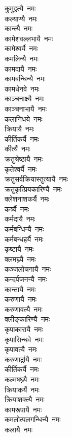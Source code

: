\begin{flushleft}
\begin{multicols}{2}
कुमुद्वत्यै~नमः\\
कल्याण्यै~नमः\\
कान्त्यै~नमः\hfill{}\\
कामेशवल्लभायै~नमः\\
कामेश्वर्यै~नमः\\
कमलिन्यै~नमः\\
कामदायै~नमः\\
कामबन्धिन्यै~नमः\\
कामधेनवे~नमः\\
काञ्चनाक्ष्यै~नमः\\
काञ्चनाभायै~नमः\\
कलानिधये~नमः\\
क्रियायै~नमः\hfill{}\\
कीर्तिकर्यै~नमः\\
कीर्त्यै~नमः\\
क्रतुश्रेष्ठायै~नमः\\
कृतेश्वर्यै~नमः\\
क्रतुसर्वक्रियास्तुत्यायै~नमः\\
क्रतुकृत्प्रियकारिण्यै~नमः\\
क्लेशनाशकर्यै~नमः\\
कर्त्र्यै~नमः\\
कर्मदायै~नमः\\
कर्मबन्धिन्यै~नमः\hfill{}\\
कर्मबन्धहर्यै~नमः\\
कृष्टायै~नमः\\
क्लमघ्न्यै~नमः\\
कञ्जलोचनायै~नमः\\
कन्दर्पजनन्यै~नमः\\
कान्तायै~नमः\\
करुणायै~नमः\\
करुणावत्यै~नमः\\
क्लीङ्कारिण्यै~नमः\\
कृपाकारायै~नमः\hfill{}\\
कृपासिन्धवे~नमः\\
कृपावत्यै~नमः\\
करुणार्द्रायै~नमः\\
कीर्तिकर्यै~नमः\\
कल्मषघ्न्यै~नमः\\
क्रियाकर्यै~नमः\\
क्रियाशक्त्यै~नमः\\
कामरूपायै~नमः\\
कमलोत्पलगन्धिन्यै~नमः\\
कलायै~नमः\hfill{}\\

\end{multicols}
\end{flushleft}
